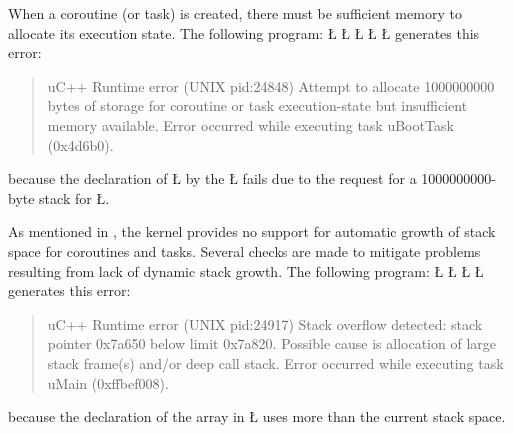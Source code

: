\documentclass[openright,twoside]{report}
\begin{document}
When a coroutine (or task) is created, there must be sufficient memory to allocate its execution state.
The following program:
\LGinlinefalse\LGbegin\lgrinde
\L{}
\L{\LB{}}
\CE{}\L{\LB{\}}}
\L{}
\L{\LB{\}}}
\endlgrinde\LGend
generates this error:
\begin{quote}
\BGfont
uC++ Runtime error (UNIX pid:24848) Attempt to allocate 1000000000 bytes of storage for coroutine or task execution-state but insufficient memory available.
Error occurred while executing task uBootTask (0x4d6b0).
\end{quote}
because the declaration of \LGinlinetrue\LGbegin\lgrinde\L{}\endlgrinde\LGend{} by the \LGinlinetrue\LGbegin\lgrinde\L{}\endlgrinde\LGend{} fails due to the request for a 1000000000-byte stack for \LGinlinetrue\LGbegin\lgrinde\L{}\endlgrinde\LGend{}.

As mentioned in , the \uC kernel provides no support for automatic growth of stack space for coroutines and tasks.
Several checks are made to mitigate problems resulting from lack of dynamic stack growth.
The following program:
\LGinlinefalse\LGbegin\lgrinde
\L{}
\L{\LB{}}
\CE{}\L{\LB{}}
\L{\LB{\}}}
\endlgrinde\LGend
generates this error:
\begin{quote}
\BGfont
uC++ Runtime error (UNIX pid:24917) Stack overflow detected: stack pointer 0x7a650 below limit 0x7a820.
Possible cause is allocation of large stack frame(s) and/or deep call stack.
Error occurred while executing task uMain (0xffbef008).
\end{quote}
because the declaration of the array in \LGinlinetrue\LGbegin\lgrinde\L{}\endlgrinde\LGend{} uses more than the current stack space.
\end{document}
